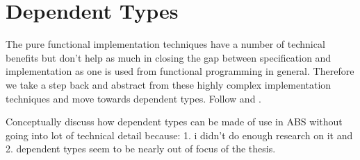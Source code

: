 \chapter{Dependent Types}

The pure functional implementation techniques have a number of technical benefits but don't help as much in closing the gap between specification and implementation as one is used from functional programming in general. Therefore we take a step back and abstract from these highly complex implementation techniques and move towards dependent types. Follow \cite{botta_time_2010} and \cite{botta_functional_2011}.

Conceptually discuss how dependent types can be made of use in ABS without going into lot of technical detail because: 1. i didn't do enough research on it and 2. dependent types seem to be nearly out of focus of the thesis.


